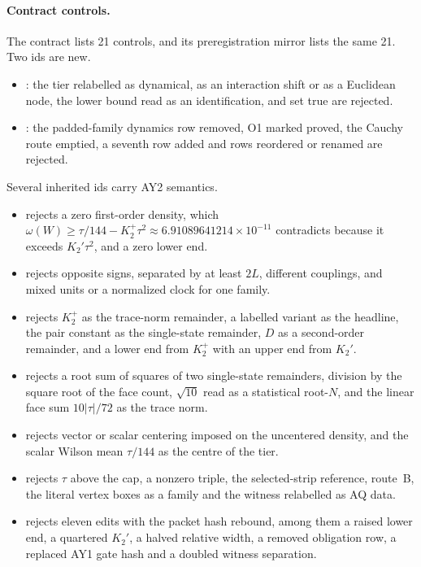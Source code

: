 \paragraph{Contract controls.}
The contract lists 21 controls, and its preregistration mirror lists the same
21. Two ids are new.
\begin{itemize}\raggedright
\item {}: the tier relabelled as
 dynamical, as an interaction shift or as a Euclidean node, the lower bound
 read as an identification, and  set true
 are rejected.
\item {}: the padded-family dynamics row
 removed, O1 marked proved, the Cauchy route emptied, a seventh row added and
 rows reordered or renamed are rejected.
\end{itemize}
Several inherited ids carry AY2 semantics.
\begin{itemize}\raggedright
\item {} rejects a zero first-order density,
 which $\omega(W)\ge\tau/144-K_2^+\tau^2\approx6.91089641214\times10^{-11}$
 contradicts because it exceeds $K_2'\tau^2$, and a zero lower end.
\item {} rejects opposite signs, separated by at least
 $2L$, different couplings, and mixed units or a normalized clock for one
 family.
\item {} rejects $K_2^+$ as the trace-norm
 remainder, a labelled variant as the headline, the pair constant as the
 single-state remainder, $D$ as a second-order remainder, and a lower end
 from $K_2^+$ with an upper end from $K_2'$.
\item {} rejects a root sum of squares of two single-state
 remainders, division by the square root of the face count, $\sqrt{10}$ read
 as a statistical root-$N$, and the linear face sum $10|\tau|/72$ as the
 trace norm.
\item {} rejects vector or scalar
 centering imposed on the uncentered density, and the scalar Wilson mean
 $\tau/144$ as the centre of the tier.
\item {} rejects $\tau$ above the cap, a nonzero
 triple, the selected-strip reference, route~B, the literal vertex boxes as a
 family and the witness relabelled as AQ data.
\item {} rejects eleven edits with the
 packet hash rebound, among them a raised lower end, a quartered $K_2'$, a
 halved relative width, a removed obligation row, a replaced AY1 gate hash
 and a doubled witness separation.
\end{itemize}

